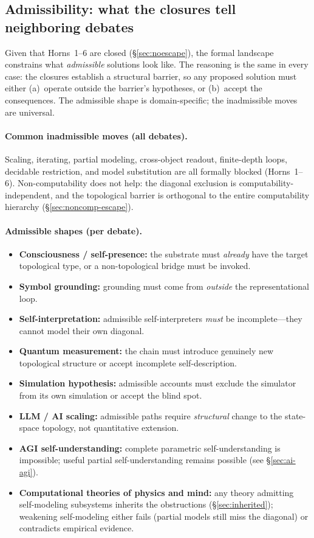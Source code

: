 \documentclass[11pt]{article}
\begin{document}
\subsection{Admissibility: what the closures tell neighboring debates}
\label{sec:admissibility}

Given that Horns~1--6 are closed (\S\ref{sec:noescape}), the formal
landscape constrains what \emph{admissible} solutions look like.  The
reasoning is the same in every case: the closures establish a structural
barrier, so any proposed solution must either (a)~operate outside the
barrier's hypotheses, or (b)~accept the consequences.  The admissible
shape is domain-specific; the inadmissible moves are universal.

\paragraph{Common inadmissible moves (all debates).}
Scaling, iterating, partial modeling, cross-object readout,
finite-depth loops, decidable restriction, and model substitution are
all formally blocked (Horns~1--6).  Non-computability does not help:
the diagonal exclusion is computability-independent, and the
topological barrier is orthogonal to the entire computability hierarchy
(\S\ref{sec:noncomp-escape}).

\paragraph{Admissible shapes (per debate).}
\begin{itemize}[leftmargin=1.5em,itemsep=0.2ex,topsep=0.4ex,parsep=0pt]
\item \textbf{Consciousness / self-presence:} the substrate must
  \emph{already} have the target topological type, or a
  non-topological bridge must be invoked.
\item \textbf{Symbol grounding:} grounding must come from
  \emph{outside} the representational loop.
\item \textbf{Self-interpretation:} admissible self-interpreters
  \emph{must} be incomplete---they cannot model their own diagonal.
\item \textbf{Quantum measurement:} the chain must introduce genuinely
  new topological structure or accept incomplete self-description.
\item \textbf{Simulation hypothesis:} admissible accounts must
  exclude the simulator from its own simulation or accept the blind spot.
\item \textbf{LLM / AI scaling:} admissible paths require
  \emph{structural} change to the state-space topology, not
  quantitative extension.
\item \textbf{AGI self-understanding:} complete parametric
  self-understanding is impossible; useful partial self-understanding
  remains possible (see \S\ref{sec:ai-agi}).
\item \textbf{Computational theories of physics and mind:} any
  theory admitting self-modeling subsystems inherits the obstructions
  (\S\ref{sec:inherited}); weakening self-modeling either fails
  (partial models still miss the diagonal) or contradicts empirical
  evidence.
\end{itemize}
\end{document}
